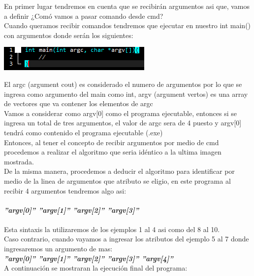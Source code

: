 \documentclass[12pt,letterpaper]{report}
\begin{document}
En primer lugar tendremos en cuenta que se recibirán argumentos asi que, vamos a definir ¿Comó vamos a pasar comando desde cmd? \\
Cuando queramos recibir comandos tendremos que ejecutar en nuestro int main() con argumentos donde serán los siguientes:\\

\begin{center}
\includegraphics[scale=0.7]{argumentos}
\end{center}

El argc (argument cout) es considerado el numero de argumentos por lo que se ingresa como argumento del main como int, argv (argument vertos) es una array de vectores que va contener los elementos de argc\\

Vamos a considerar como argv[0] como el programa ejecutable, entonces si se ingresa un total de tres argumentos, el valor de argc sera de 4 puesto y argv[0] tendrá como contenido el programa ejecutable (.exe)\\

Entonces, al tener el concepto de recibir argumentos por medio de cmd procedemos a realizar el algoritmo que seria idéntico a la ultima imagen mostrada.\\

De la misma manera, procedemos a deducir el algoritmo para identificar por medio de la linea de argumentos que atributo se eligio, en este programa al recibir 4 argumentos tendremos algo asi:\\\\

\textbf{\textit{ ''argv[0]''  ''argv[1]''  ''argv[2]''  ''argv[3]'' }}\\\\

Esta sintaxis la utilizaremos de los ejemplos 1 al 4 asi como del 8 al 10.\\
Caso contrario, cuando vayamos a ingresar los atributos del ejemplo 5 al 7 donde ingresaremos un argumento de mas:\\

\textbf{\textit{ ''argv[0]''  ''argv[1]''  ''argv[2]''  ''argv[3]''  ''argv[4]'' }}\\

\newpage
A continuación se mostraran la ejecución final del programa:\\
\end{document}
